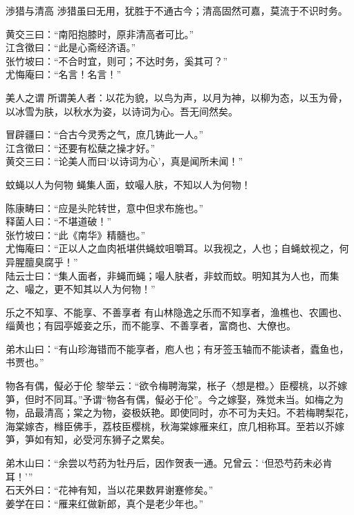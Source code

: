 \begin{yulu}{渉猎与清高}
渉猎虽曰无用，犹胜于不通古今；清高固然可嘉，莫流于不识时务。
\begin{comments}
黄交三曰：“南阳抱膝时，原非清高者可比。” \\
江含徵曰：“此是心斋经济语。” \\
张竹坡曰：“不合时宜，则可；不达时务，奚其可？” \\
尤悔庵曰：“名言！名言！”
\end{comments}
\end{yulu}

\begin{yulu}{美人之谓}
所谓美人者：以花为貌，以鸟为声，以月为神，以柳为态，以玉为骨，以冰雪为肤，以秋水为姿，以诗词为心。吾无间然矣。
\begin{comments}
冒辟疆曰：“合古今灵秀之气，庶几铸此一人。” \\
江含徵曰：“还要有松蘖之操才好。” \\
黄交三曰：“论美人而曰‘以诗词为心’，真是闻所未闻！”
\end{comments}
\end{yulu}

\begin{yulu}{蚊蝇以人为何物}
蝇集人面，蚊嘬人肤，不知以人为何物！
\begin{comments}
陈康畴曰：“应是头陀转世，意中但求布施也。” \\
释菌人曰：“不堪道破！” \\
张竹坡曰：“此《南华》精髓也。” \\
尤悔庵曰：“正以人之血肉衹堪供蝇蚊咀嚼耳。以我视之，人也；自蝇蚊视之，何异腥膻臭腐乎！” \\
陆云士曰：“集人面者，非蝇而蝇；嘬人肤者，非蚊而蚊。明知其为人也，而集之、嘬之，更不知其以人为何物！”
\end{comments}
\end{yulu}

\begin{yulu}{乐之不知享、不能享、不善享者}
有山林隐逸之乐而不知享者，渔樵也、农圃也、缁黄也；有园亭姬妾之乐，而不能享、不善享者，富商也、大僚也。
\begin{comments}
弟木山曰：“有山珍海错而不能享者，庖人也；有牙签玉轴而不能读者，蠹鱼也，书贾也。”
\end{comments}
\end{yulu}

\begin{yulu}{物各有偶，儗必于伦}
黎举云：“欲令梅聘海棠，枨子〈想是橙。〉臣樱桃，以芥嫁笋，但时不同耳。”予谓“物各有偶，儗必于伦”。今之嫁娶，殊觉未当。如梅之为物，品最清高；棠之为物，姿极妖艳。即使同时，亦不可为夫妇。不若梅聘梨花，海棠嫁杏，橼臣佛手，荔枝臣樱桃，秋海棠嫁雁来红，庶几相称耳。至若以芥嫁笋，笋如有知，必受河东狮子之累矣。
\begin{comments}
弟木山曰：“余尝以芍药为牡丹后，因作贺表一通。兄曾云：‘但恐芍药未必肯耳！’” \\
石天外曰：“花神有知，当以花果数昇谢蹇修矣。” \\
姜学在曰：“雁来红做新郎，真个是老少年也。”
\end{comments}
\end{yulu}

